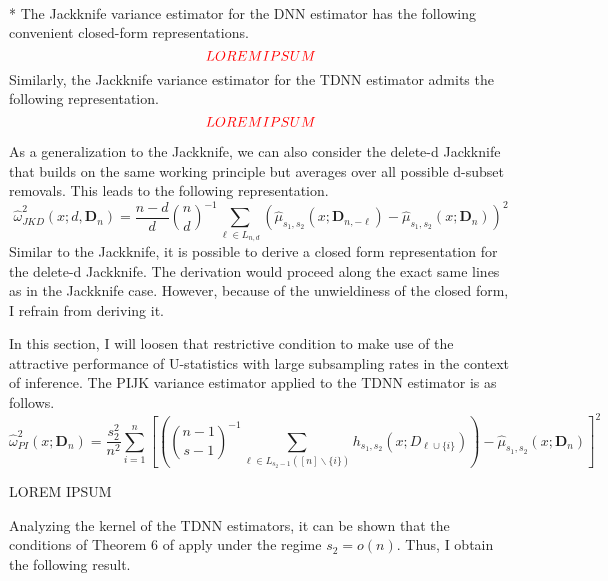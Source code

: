 \begin{boxD}
	\begin{thm}\label{thm:JK_closed_form}\mbox{}\\*
		The Jackknife variance estimator for the DNN estimator has the following convenient closed-form representations.
		\begin{equation}
			{\color{red} LOREM IPSUM}
		\end{equation}
		Similarly, the Jackknife variance estimator for the TDNN estimator admits the following representation.
		\begin{equation}
			{\color{red} LOREM IPSUM}
		\end{equation}
	\end{thm}
\end{boxD}

As a generalization to the Jackknife, we can also consider the delete-d Jackknife that builds on the same working principle but averages over all possible d-subset removals.
This leads to the following representation.
\begin{equation}\label{eq:JKD_Var_Est}
	\hat{\omega}_{JKD}^2\left(x; d, \mathbf{D}_n\right)
	= \frac{n-d}{d}\binom{n}{d}^{-1} \sum_{\ell \in L_{n,d}}
	\left(\hat{\mu}_{s_1, s_2}\left(x; \mathbf{D}_{n, -\ell}\right)
	- \hat{\mu}_{s_1, s_2}\left(x; \mathbf{D}_{n}\right)
	\right)^2
\end{equation}
Similar to the Jackknife, it is possible to derive a closed form representation for the delete-d Jackknife.
The derivation would proceed along the exact same lines as in the Jackknife case.
However, because of the unwieldiness of the closed form, I refrain from deriving it.

In this section, I will loosen that restrictive condition to make use of the attractive performance of U-statistics with large subsampling rates in the context of inference.
The PIJK variance estimator applied to the TDNN estimator is as follows.
\begin{equation}\label{eq:PIJK_Var_Est}
	\hat{\omega}_{PI}^2\left(x; \mathbf{D}_n\right)
	= \frac{s_2^2}{n^2}\sum_{i = 1}^{n}\left[\left(
		\binom{n-1}{s-1}^{-1} \sum_{\ell \in L_{s_2-1}([n]\backslash\{i\})} h_{s_1, s_2}\left(x; D_{\ell \cup \{i\}}\right)\right)
		- \hat{\mu}_{s_1, s_2}\left(x; \mathbf{D}_n\right)\right]^2
\end{equation}

{\color{red} LOREM IPSUM}

Analyzing the kernel of the TDNN estimators, it can be shown that the conditions of Theorem 6 of \citet{peng_bias_2021} apply under the regime $s_2 = o(n)$.
Thus, I obtain the following result.
	
